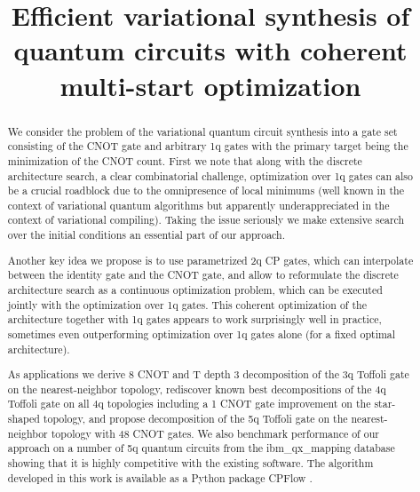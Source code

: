 \documentclass[twocolumn, amsfonts, amssymb, aps, nofootinbib]{revtex4-2}
\newcommand{\CX}{CNOT }
\newcommand{\CP}{CP }
\newcommand{\T}{T }
\newcommand{\package}[1]{\textrm {#1 }}
\newcommand{\cpflow}{\package{CPFlow}}
\begin{document}
\title{Efficient variational synthesis of quantum circuits with coherent multi-start optimization}
\begin{abstract}
We consider the problem of the variational quantum circuit synthesis into a gate set consisting of the \CX gate and arbitrary 1q gates with the primary target being the minimization of the \CX count. First we note that along with the discrete architecture search, a clear combinatorial challenge, optimization over 1q gates can also be a crucial roadblock due to the omnipresence of local minimums (well known in the context of variational quantum algorithms but apparently underappreciated in the context of variational compiling). Taking the issue seriously we make extensive search over the initial conditions an essential part of our approach. 

Another key idea we propose is to use parametrized 2q \CP gates, which can interpolate between the identity gate and the \CX gate, and allow to reformulate the discrete architecture search as a continuous optimization problem, which can be executed jointly with the optimization over 1q gates. This coherent optimization of the architecture together with 1q gates appears to work surprisingly well in practice, sometimes even outperforming optimization over 1q gates alone (for a fixed optimal architecture).

As applications we derive 8 \CX and \T depth 3 decomposition of the 3q Toffoli gate on the nearest-neighbor topology, rediscover known best decompositions of the 4q Toffoli gate on all 4q topologies including a  1 \CX gate improvement on the star-shaped topology, and propose decomposition of the 5q Toffoli gate on the nearest-neighbor topology with 48 \CX gates. We also benchmark performance of our approach on a number of 5q quantum circuits from the ibm\_qx\_mapping database showing that it is highly competitive with the existing software. The algorithm developed in this work is available as a Python package \cpflow \cite{}. 
\end{abstract}
\maketitle	
\tableofcontents
\end{document}

